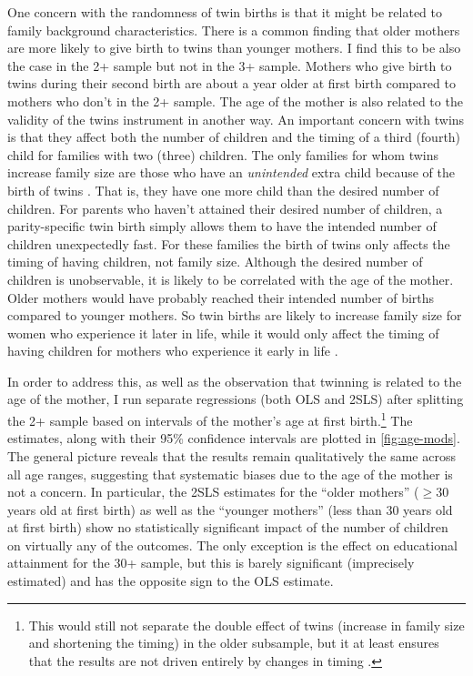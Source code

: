 One concern with the randomness of twin births is that it might be related to family background characteristics. There is a common finding that older mothers are more likely to give birth to twins than younger mothers. I find this to be also the case in the 2+ sample but not in the 3+ sample. Mothers who give birth to twins during their second birth are about a year older at first birth compared to mothers who don't in the 2+ sample. The age of the mother is also related to the validity of the twins instrument in another way. An important concern with twins is that they affect both the number of children and the timing of a third (fourth) child for families with two (three) children. The only families for whom twins increase family size are those who have an \textit{unintended} extra child because of the birth of twins \parencite{oberg_casual_2021}. That is, they have one more child than the desired number of children. For parents who haven’t attained their desired number of children, a parity-specific twin birth simply allows them to have the intended number of children unexpectedly fast. For these families the birth of twins only affects the timing of having children, not family size. Although the desired number of children is unobservable, it is likely to be correlated with the age of the mother. Older mothers would have probably reached their intended number of births compared to younger mothers. So twin births are likely to increase family size for women who experience it later in life, while it would only affect the timing of having children for mothers who experience it early in life \parencite{caceres-delpiano_impacts_2006}. 

In order to address this, as well as the observation that twinning is related to the age of the mother, I run separate regressions (both OLS and 2SLS) after splitting the 2+ sample based on intervals of the mother's age at first birth.\footnote{ This would still not separate the double effect of twins (increase in family size and shortening the timing) in the older subsample, but it at least ensures that the results are not driven entirely by changes in timing \parencite[see][p.~751]{caceres-delpiano_impacts_2006}. } The estimates, along with their 95\% confidence intervals are plotted in \autoref{fig:age-mods}. The general picture reveals that the results remain qualitatively the same across all age ranges, suggesting that systematic biases due to the age of the mother is not a concern. In particular, the 2SLS estimates for the \enquote{older mothers} ($ \geq 30 $ years old at first birth) as well as the \enquote{younger mothers} (less than 30 years old at first birth) show no statistically significant impact of the number of children on virtually any of the outcomes. The only exception is the effect on educational attainment for the 30+ sample, but this is barely significant (imprecisely estimated) and has the opposite sign to the OLS estimate. 

